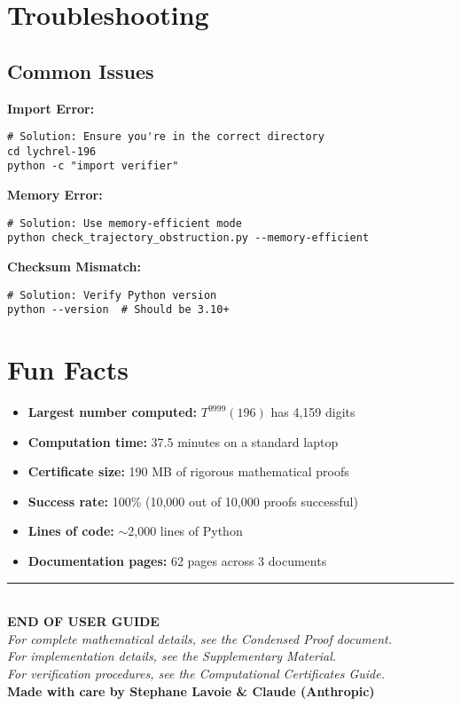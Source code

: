 \documentclass[11pt,a4paper]{article}
\begin{document}
\section{Troubleshooting}

\subsection{Common Issues}

\textbf{Import Error:}
\begin{lstlisting}[style=bashstyle]
# Solution: Ensure you're in the correct directory
cd lychrel-196
python -c "import verifier"
\end{lstlisting}

\textbf{Memory Error:}
\begin{lstlisting}[style=bashstyle]
# Solution: Use memory-efficient mode
python check_trajectory_obstruction.py --memory-efficient
\end{lstlisting}

\textbf{Checksum Mismatch:}
\begin{lstlisting}[style=bashstyle]
# Solution: Verify Python version
python --version  # Should be 3.10+
\end{lstlisting}

\section{Fun Facts}

\begin{itemize}[leftmargin=*]
\item \textbf{Largest number computed:} $T^{9999}(196)$ has 4,159 digits
\item \textbf{Computation time:} 37.5 minutes on a standard laptop
\item \textbf{Certificate size:} 190 MB of rigorous mathematical proofs
\item \textbf{Success rate:} 100\% (10,000 out of 10,000 proofs successful)
\item \textbf{Lines of code:} $\sim$2,000 lines of Python
\item \textbf{Documentation pages:} 62 pages across 3 documents
\end{itemize}


\vspace{2cm}

\begin{center}
\rule{\textwidth}{0.4pt}
\\[0.5cm]
\Large\textbf{END OF USER GUIDE}
\\[0.3cm]
\normalsize
\textit{For complete mathematical details, see the Condensed Proof document.}\\
\textit{For implementation details, see the Supplementary Material.}\\
\textit{For verification procedures, see the Computational Certificates Guide.}
\\[0.5cm]
\textbf{Made with care by Stephane Lavoie \& Claude (Anthropic)}
\end{center}
\end{document}
